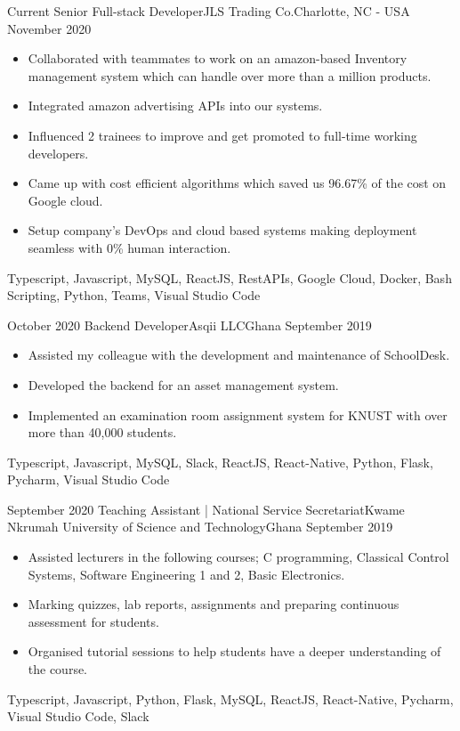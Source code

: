 \begin{experiences}
      \experience
    {Current}   {Senior Full-stack Developer}{JLS Trading Co.}{Charlotte, NC - USA}
    {November 2020} {
                      \begin{itemize}
			\item Collaborated with teammates to work on an amazon-based Inventory management system which can handle over more than a million products.
			\item Integrated amazon advertising APIs into our systems.
			\item Influenced 2 trainees to improve and get promoted to full-time working developers.
			\item Came up with cost efficient algorithms which saved us 96.67\% of the cost on Google cloud.
			\item Setup company’s DevOps and cloud based systems making deployment seamless with 0\% human interaction.
		    \end{itemize}
                    }
                    {Typescript, Javascript, MySQL, ReactJS, RestAPIs, Google Cloud, Docker, Bash Scripting, Python, Teams, Visual Studio Code}
  \emptySeparator

  
  \experience
    {October 2020}   {Backend Developer}{Asqii LLC}{Ghana}
    {September 2019} {
                      \begin{itemize}
                        \item Assisted my colleague with the development and maintenance of SchoolDesk.
                        \item Developed the backend for an asset management system.
                        \item Implemented an examination room assignment system for KNUST with over more than 40,000 students.
                      \end{itemize}
                    }
                    {Typescript, Javascript, MySQL, Slack, ReactJS, React-Native, Python, Flask, Pycharm, Visual Studio Code}
  \emptySeparator
  
  
    \experience
    {September 2020}   {Teaching Assistant | National Service Secretariat}{Kwame Nkrumah University of Science and Technology}{Ghana}
    {September 2019} {
                      \begin{itemize}
                        \item Assisted lecturers in the following courses; C programming, Classical Control Systems, Software Engineering 1 and 2, Basic Electronics.
                        \item Marking quizzes, lab reports, assignments and preparing continuous assessment for students.
                        \item Organised tutorial sessions to help students have a deeper understanding of the course.
                      \end{itemize}
                    }
                    {Typescript, Javascript, Python, Flask, MySQL, ReactJS, React-Native, Pycharm, Visual Studio Code, Slack}
  \emptySeparator
  

\end{experiences}
